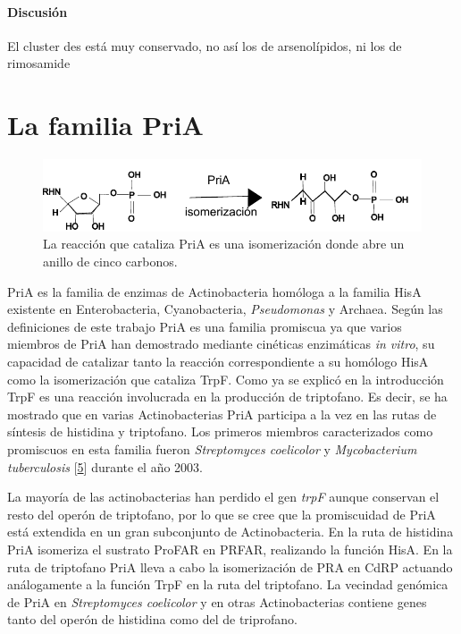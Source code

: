 \documentclass[12pt,twoside]{reedthesis}
\begin{document}
  \subsubsection{Discusión}\label{discusion}
  
  El cluster des está muy conservado, no así los de arsenolípidos, ni los
  de rimosamide
  
  \chapter{La familia PriA}\label{la-familia-pria}
  
  \begin{figure}[h!tbp]
  \centering
  \includegraphics[angle = 0,scale = 1]{chapter4/isomerizacion.pdf}
  \caption[La reacción que cataliza PriA es una isomerización donde abre un anillo de cinco carbonos.]{\footnotesize{La reacción que cataliza PriA es una isomerización donde abre un anillo de cinco carbonos.}}
  \label{fig:isomerizacion}
  \end{figure}
  
  PriA es la familia de enzimas de Actinobacteria homóloga a la familia
  HisA existente en Enterobacteria, Cyanobacteria, \emph{Pseudomonas} y
  Archaea. Según las definiciones de este trabajo PriA es una familia
  promiscua ya que varios miembros de PriA han demostrado mediante
  cinéticas enzimáticas \emph{in vitro}, su capacidad de catalizar tanto
  la reacción correspondiente a su homólogo HisA como la isomerización que
  cataliza TrpF. Como ya se explicó en la introducción TrpF es una
  reacción involucrada en la producción de triptofano. Es decir, se ha
  mostrado que en varias Actinobacterias PriA participa a la vez en las
  rutas de síntesis de histidina y triptofano. Los primeros miembros
  caracterizados como promiscuos en esta familia fueron \emph{Streptomyces
  coelicolor} y \emph{Mycobacterium tuberculosis}
  {[}\protect\hyperlink{ref-baronagomez_occurrence_2003}{5}{]} durante el
  año 2003.
  
  La mayoría de las actinobacterias han perdido el gen \emph{trpF} aunque
  conservan el resto del operón de triptofano, por lo que se cree que la
  promiscuidad de PriA está extendida en un gran subconjunto de
  Actinobacteria. En la ruta de histidina PriA isomeriza el sustrato
  ProFAR en PRFAR, realizando la función HisA. En la ruta de triptofano
  PriA lleva a cabo la isomerización de PRA en CdRP actuando análogamente
  a la función TrpF en la ruta del triptofano. La vecindad genómica de
  PriA en \emph{Streptomyces coelicolor} y en otras Actinobacterias
  contiene genes tanto del operón de histidina como del de triprofano.
  
\end{document}
